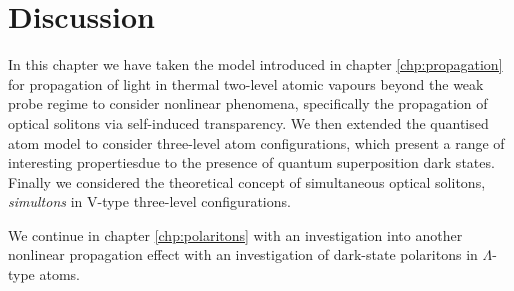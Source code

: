 \section{Discussion}
  \label{sec:nonlinear_discussion}

    In this chapter we have taken the model introduced in chapter
    \ref{chp:propagation} for propagation of light in thermal two-level atomic
    vapours beyond the weak probe regime to consider nonlinear phenomena,
    specifically the propagation of optical solitons via self-induced
    transparency. We then extended the quantised atom model to consider 
    three-level atom configurations, which present a range of interesting 
    propertiesdue to the presence of quantum superposition dark states. Finally 
    we considered the theoretical concept of simultaneous optical solitons,
    \textit{simultons} in V-type three-level configurations.

    We continue in chapter \ref{chp:polaritons} with an investigation into
    another nonlinear propagation effect with an investigation of dark-state
    polaritons in $\Lambda$-type atoms.
